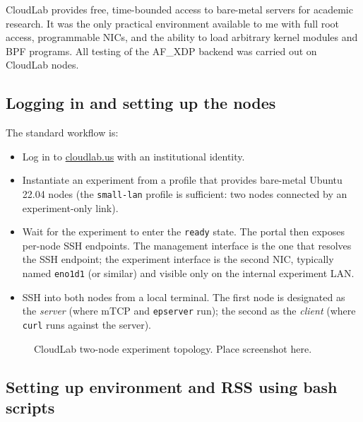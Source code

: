 \documentclass[10pt, letterpaper, twocolumn]{article}
\begin{document}
CloudLab \cite{cloudlab} provides free, time-bounded access to bare-metal servers for academic research. It was the only practical environment available to me with full root access, programmable NICs, and the ability to load arbitrary kernel modules and BPF programs. All testing of the AF\_XDP backend was carried out on CloudLab nodes.

\subsection{Logging in and setting up the nodes}

The standard workflow is:
\begin{itemize}
    \item Log in to \href{https://cloudlab.us}{cloudlab.us} with an institutional identity.
    \item Instantiate an experiment from a profile that provides bare-metal Ubuntu 22.04 nodes (the \texttt{small-lan} profile is sufficient: two nodes connected by an experiment-only link).
    \item Wait for the experiment to enter the \texttt{ready} state. The portal then exposes per-node SSH endpoints. The management interface is the one that resolves the SSH endpoint; the experiment interface is the second NIC, typically named \texttt{eno1d1} (or similar) and visible only on the internal experiment LAN.
    \item SSH into both nodes from a local terminal. The first node is designated as the \textit{server} (where mTCP and \texttt{epserver} run); the second as the \textit{client} (where \texttt{curl} runs against the server).
\end{itemize}

\begin{figure}[htbp]
    \centering
    \caption{CloudLab two-node experiment topology. Place screenshot here.}
    \label{fig:cloudlab_topo}
\end{figure}
\FloatBarrier

\subsection{Setting up environment and RSS using bash scripts}
\end{document}

